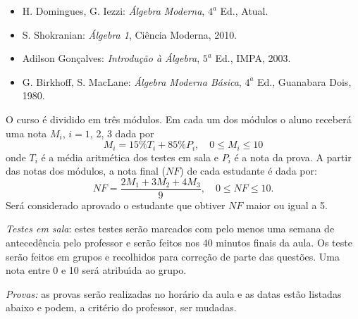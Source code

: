 \documentclass[12pt]{article}
\begin{document}
\vspace{0.5cm}
\begin{itemize}

\item H. Domingues, G. Iezzi: {\it {\'A}lgebra Moderna}, $4^a$
  Ed., Atual.

\item S. Shokranian: {\it {\'A}lgebra 1}, Ci{\^e}ncia Moderna, 2010.

\item Adilson Gon{\c c}alves: {\it Introdu{\c c}{\~a}o {\`a} {\'A}lgebra}, $5^a$ Ed., IMPA,
  2003.

\item G. Birkhoff, S. MacLane: {\it {\'A}lgebra Moderna B{\'a}sica}, $4^a$ Ed.,
  Guanabara Dois, 1980.

\end{itemize}

 O curso \'{e} dividido em tr\^{e}s
m\'{o}dulos.  Em cada um dos m\'odulos o aluno receber\'a uma nota $M_i$, $i = 1$, 2, 3 dada por
\[
    M_i = 15\%T_i + 85\%P_i, \quad 0 \le M_i \le 10
\]
onde $T_i$  \'e a m\'edia aritm\'etica dos testes em sala e $P_i$ \'e a nota da prova. A partir das notas dos m\'odulos, a nota final ($NF$) de cada estudante \'e dada por:
\[
    NF = \dfrac{2M_1 + 3M_2 + 4M_3}{9}, \quad 0 \le NF \le 10.
\]
Ser\'a considerado aprovado o estudante que obtiver $NF$ maior ou igual a 5.

\vspace{0.5cm}
\noindent\textit{Testes em sala}: estes testes ser\~ao marcados com pelo menos uma semana de anteced\^encia pelo professor e ser\~ao feitos nos 40 minutos finais da aula. Os teste ser\~ao feitos em grupos  e recolhidos para corre\c{c}\~ao de parte das quest\~oes. Uma nota entre 0 e 10 ser\'a atribu{\'\i}da ao grupo.

\vspace{0.5cm}

\noindent\textit{Provas:} as provas ser\~ao realizadas no hor\'ario da aula e as datas est\~ao listadas abaixo e podem, a crit\'erio do professor, ser mudadas.
\end{document}
